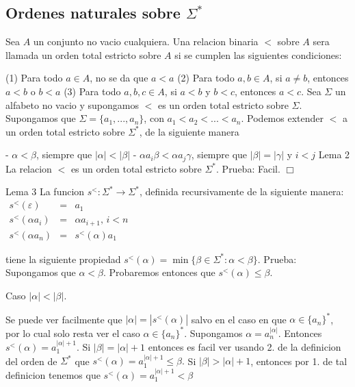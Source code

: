 \subsection{Ordenes naturales sobre \(\Sigma ^{\ast }\)}

Sea \(A\) un conjunto no vacio cualquiera. Una relacion binaria \(< \) sobre \(A\) sera llamada un orden total estricto sobre \(A\) si se cumplen las siguientes condiciones:

(1) Para todo \(a\in A\), no se da que \(a< a\)
(2) Para todo \(a,b\in A\), si \(a\neq b\), entonces \(a< b\) o \(b< a\)
(3) Para todo \(a,b,c\in A\), si \(a< b\) y \(b< c\), entonces \(a< c\).
Sea \(\Sigma \) un alfabeto no vacio y supongamos \(< \) es un orden total estricto sobre \(\Sigma \). Supongamos que \(\Sigma =\{a_{1},...,a_{n}\}\), con \( a_{1}< a_{2}< ...< a_{n}\). Podemos extender \(< \) a un orden total estricto sobre \(\Sigma ^{\ast }\), de la siguiente manera

- \(\alpha < \beta \), siempre que \(\left\vert \alpha \right\vert < \left\vert \beta \right\vert \)
- \(\alpha a_{i}\beta < \alpha a_{j}\gamma \), siempre que \(\left\vert \beta \right\vert =\left\vert \gamma \right\vert \) y \(i< j\)
Lema 2 La relacion \(< \) es un orden total estricto sobre \(\Sigma ^{\ast }\).
Prueba: Facil. \(\Box\)

Lema 3 La funcion \(s^{< }:\Sigma ^{\ast }\rightarrow \Sigma ^{\ast }\), definida recursivamente de la siguiente manera:
\(\displaystyle \begin{array}{rcl} s^{< }(\varepsilon ) & =& a_{1} \\ s^{< }(\alpha a_{i}) & =& \alpha a_{i+1}\text{, }i< n \\ s^{< }(\alpha a_{n}) & =& s^{< }(\alpha )a_{1} \end{array} \)

tiene la siguiente propiedad
\(\displaystyle s^{< }(\alpha )=\min \{\beta \in \Sigma ^{\ast }:\alpha < \beta \}\text{.} \)
Prueba: Supongamos que \(\alpha < \beta \). Probaremos entonces que \(s^{< }(\alpha )\leq \beta \).

Caso \(\left\vert \alpha \right\vert < \left\vert \beta \right\vert \).

Se puede ver facilmente que \(\left\vert \alpha \right\vert =\left\vert s^{< }(\alpha )\right\vert \) salvo en el caso en que \(\alpha \in \{a_{n}\}^{\ast }\), por lo cual solo resta ver el caso \(\alpha \in \{a_{n}\}^{\ast }.\) Supongamos \(\alpha =a_{n}^{\left\vert \alpha \right\vert }.\) Entonces \(s^{< }(\alpha )=a_{1}^{\left\vert \alpha \right\vert +1}.\) Si \( \left\vert \beta \right\vert =\left\vert \alpha \right\vert +1\) entonces es facil ver usando 2. de la definicion del orden de \(\Sigma ^{\ast }\) que \( s^{< }(\alpha )=a_{1}^{\left\vert \alpha \right\vert +1}\leq \beta .\) Si \( \left\vert \beta \right\vert >\left\vert \alpha \right\vert +1\), entonces por 1. de tal definicion tenemos que \(s^{< }(\alpha )=a_{1}^{\left\vert \alpha \right\vert +1}< \beta \)

